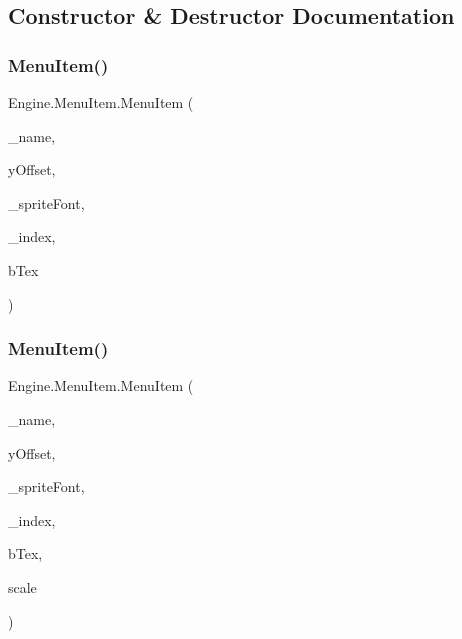 \subsection{Constructor \& Destructor Documentation}
\mbox{\label{a00578_af8c1e0084202dd6048beb56c3e8ea1eb}} 
\subsubsection{\texorpdfstring{Menu\+Item()}{MenuItem()}\hspace{0.1cm}{\footnotesize\ttfamily [1/2]}}
{\footnotesize\ttfamily Engine.\+Menu\+Item.\+Menu\+Item (\begin{DoxyParamCaption}\item[{string}]{\+\_\+name,  }\item[{float}]{y\+Offset,  }\item[{Sprite\+Font}]{\+\_\+sprite\+Font,  }\item[{int}]{\+\_\+index,  }\item[{Texture2D}]{b\+Tex }\end{DoxyParamCaption})\hspace{0.3cm}{\ttfamily [inline]}}

\mbox{\label{a00578_a79a905f74d6632e0c8cda3cd951072a2}} 
\subsubsection{\texorpdfstring{Menu\+Item()}{MenuItem()}\hspace{0.1cm}{\footnotesize\ttfamily [2/2]}}
{\footnotesize\ttfamily Engine.\+Menu\+Item.\+Menu\+Item (\begin{DoxyParamCaption}\item[{string}]{\+\_\+name,  }\item[{float}]{y\+Offset,  }\item[{Sprite\+Font}]{\+\_\+sprite\+Font,  }\item[{int}]{\+\_\+index,  }\item[{Texture2D}]{b\+Tex,  }\item[{float}]{scale }\end{DoxyParamCaption})\hspace{0.3cm}{\ttfamily [inline]}}



